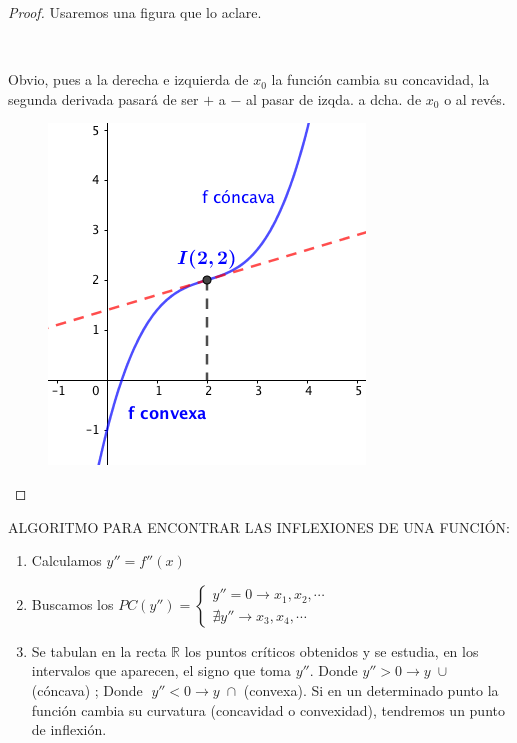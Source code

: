 	
	
	\begin{proof}
	Usaremos una figura que lo aclare.
	
	\begin{multicols}{2}
	
$\quad$
	
		Obvio, pues a la derecha e izquierda de $x_0$ la función cambia su concavidad, la segunda derivada pasará de ser $+$ a $-$ al pasar de izqda. a dcha. de $x_0$ o al revés.
	
	\begin{figure}[H]
	\centering
	\includegraphics[width=.25\textwidth]{imagenes/imagenes05/T05IM15.png}
	\end{figure}
	\end{multicols}
	\end{proof}
	
	ALGORITMO PARA ENCONTRAR LAS INFLEXIONES DE UNA FUNCIÓN:	
	
	\begin{enumerate}
		\item Calculamos $y''=f''(x)$
		\item Buscamos los $PC(y'')=\begin{cases}
							y''=0 \to x_1, x_2, \cdots \\
							\nexists y'' \to x_3, x_4, \cdots	
							\end{cases}$
		\item Se tabulan en la recta $\mathbb R$ los puntos críticos obtenidos y se estudia, en los intervalos que aparecen, el signo que toma $y''$. Donde $y''>0 \to y \; \cup $ (cóncava) ;  Donde $\;  y''<0 \to y \; \cap  $ (convexa). Si en un determinado punto la función cambia su curvatura (concavidad o convexidad), tendremos un punto de inflexión.
	\end{enumerate}

